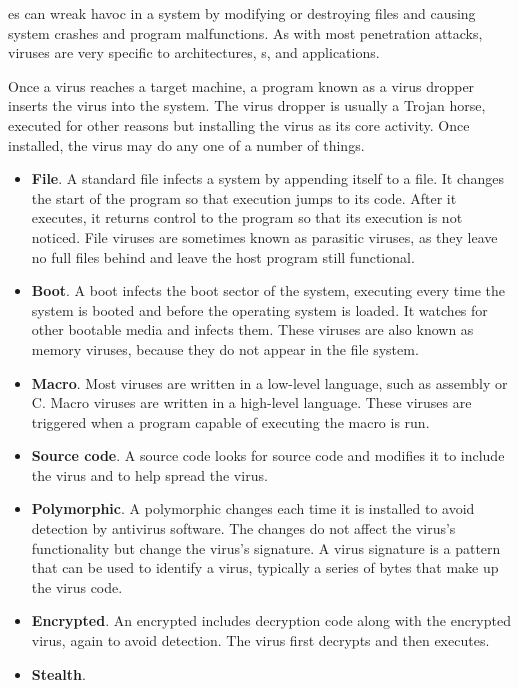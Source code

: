 es can wreak havoc in a system by modifying or destroying files and causing system crashes and program malfunctions.
As with most penetration attacks, viruses are very specific to architectures, s, and applications.

Once a virus reaches a target machine, a program known as a virus dropper inserts the virus into the system.
The virus dropper is usually a Trojan horse, executed for other reasons but installing the virus as its core activity.
Once installed, the virus may do any one of a number of things.
\begin{itemize}[noitemsep]
\item \textbf{File}.
  A standard file  infects a system by appending itself to a file.
  It changes the start of the program so that execution jumps to its code.
  After it executes, it returns control to the program so that its execution is not noticed.
  File viruses are sometimes known as parasitic viruses, as they leave no full files behind and leave the host program still functional.
\item \textbf{Boot}.
  A boot  infects the boot sector of the system, executing every time the system is booted and before the operating system is loaded.
  It watches for other bootable media and infects them.
  These viruses are also known as memory viruses, because they do not appear in the file system.
\item \textbf{Macro}.
  Most viruses are written in a low-level language, such as assembly or C.
  Macro viruses are written in a high-level language.
  These viruses are triggered when a program capable of executing the macro is run.
\item \textbf{Source code}.
  A source code  looks for source code and modifies it to include the virus and to help spread the virus.
\item \textbf{Polymorphic}.
  A polymorphic  changes each time it is installed to avoid detection by antivirus software.
  The changes do not affect the virus’s functionality but change the virus’s signature.
  A virus signature is a pattern that can be used to identify a virus, typically a series of bytes that make up the virus code.
\item \textbf{Encrypted}.
  An encrypted  includes decryption code along with the encrypted virus, again to avoid detection.
  The virus first decrypts and then executes.
\item \textbf{Stealth}.

\end{itemize}
